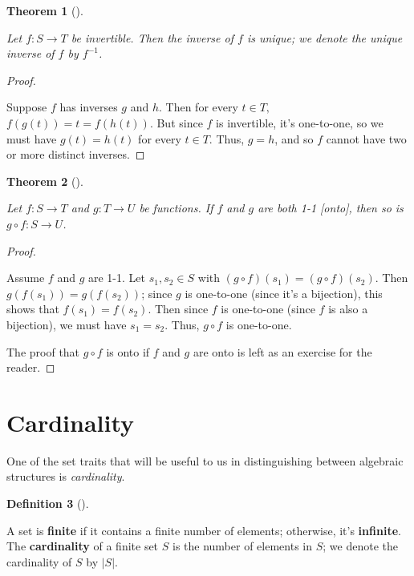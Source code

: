 \documentclass[10pt,]{book}
\newcommand{\terminology}[1]{\textbf{#1}}
\theoremstyle{plain}
\newtheorem{theorem}{Theorem}[section]
\theoremstyle{definition}
\newtheorem{definition}[theorem]{Definition}
\theoremstyle{definition}
\theoremstyle{definition}
\theoremstyle{definition}
\numberwithin{equation}{section}
\begin{document}
\begin{theorem}[{}]\label{theorem-2}

     Let \(f:S\to T\) be invertible. Then the  inverse of \(f\) is unique; we denote the unique inverse of \(f\) by \(f^{-1}\).
    \label{notation-28}
\end{theorem}
\begin{proof}\hypertarget{proof-2}{}
Suppose \(f\) has inverses \(g\) and \(h\). Then for every \(t\in T,\)
    \(f(g(t))=t=f(h(t))\). But since \(f\) is invertible, it's one-to-one, so we must have \(g(t)=h(t)\) for every \(t\in T\). Thus, \(g=h\), and so \(f\) cannot have two or more distinct inverses.%
\end{proof}
\begin{theorem}[{}]\label{compbij}

        Let \(f:S\to T\) and \(g:T\to U\) be functions.
        If \(f\) and \(g\) are both 1-1 [onto], then so is \(g\circ f: S\to U\).
\end{theorem}
\begin{proof}\hypertarget{proof-3}{}

      Assume \(f\) and \(g\) are 1-1. Let \(s_1, s_2\in S\)
      with \((g\circ f)(s_1)=(g\circ f)(s_2)\). Then \(g(f(s_1))=g(f(s_2))\);
      since \(g\) is one-to-one (since it's a bijection), this shows that
      \(f(s_1)=f(s_2)\). Then since \(f\) is one-to-one (since \(f\) is also a
      bijection), we must have \(s_1=s_2\). Thus, \(g\circ f\) is one-to-one.
\par

    The proof that \(g\circ f\) is onto if \(f\) and \(g\) are onto is left as an exercise for the reader.
\end{proof}
\typeout{************************************************}
\typeout{************************************************}
\section[{Cardinality}]{Cardinality}\label{section-3}

    One of the set traits that will be useful to us in
    distinguishing between algebraic structures is \emph{cardinality}.
\begin{definition}[{}]\label{definition-12}

        A set is \terminology{finite} if it contains a finite number of
        elements;
        otherwise, it's \terminology{infinite}. The \terminology{cardinality} of a finite set \(S\) is the
        number of elements in \(S\); we denote the cardinality of \(S\) by \(|S|\).
\label{notation-29}
\end{definition}
\par
\end{document}
